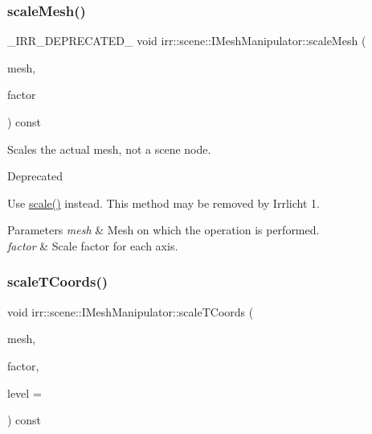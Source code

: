 \subsubsection{\texorpdfstring{scale\+Mesh()}{scaleMesh()}}
{\footnotesize\ttfamily \+\_\+\+I\+R\+R\+\_\+\+D\+E\+P\+R\+E\+C\+A\+T\+E\+D\+\_\+ void irr\+::scene\+::\+I\+Mesh\+Manipulator\+::scale\+Mesh (\begin{DoxyParamCaption}\item[{\hyperlink{classirr_1_1scene_1_1IMesh}{I\+Mesh} $\ast$}]{mesh,  }\item[{const \hyperlink{namespaceirr_1_1core_a06f169d08b5c429f5575acb7edbad811}{core\+::vector3df} \&}]{factor }\end{DoxyParamCaption}) const\hspace{0.3cm}{\ttfamily [inline]}}



Scales the actual mesh, not a scene node. 

\begin{DoxyRefDesc}{Deprecated}
\item[\hyperlink{deprecated__deprecated000014}{Deprecated}]Use \hyperlink{classirr_1_1scene_1_1IMeshManipulator_abd2a0bdd00605f638f619177e64b1cce}{scale()} instead. This method may be removed by Irrlicht 1. \end{DoxyRefDesc}

\begin{DoxyParams}{Parameters}
{\em mesh} & Mesh on which the operation is performed. \\
\hline
{\em factor} & Scale factor for each axis. \\
\hline
\end{DoxyParams}
\mbox{\label{classirr_1_1scene_1_1IMeshManipulator_a2bc907891c8db77eebcad387ae3b31c3}} 
\subsubsection{\texorpdfstring{scale\+T\+Coords()}{scaleTCoords()}\hspace{0.1cm}{\footnotesize\ttfamily [1/2]}}
{\footnotesize\ttfamily void irr\+::scene\+::\+I\+Mesh\+Manipulator\+::scale\+T\+Coords (\begin{DoxyParamCaption}\item[{\hyperlink{classirr_1_1scene_1_1IMesh}{scene\+::\+I\+Mesh} $\ast$}]{mesh,  }\item[{const \hyperlink{namespaceirr_1_1core_a2cf08556d77f6f5a792973a6e27ed11b}{core\+::vector2df} \&}]{factor,  }\item[{\hyperlink{namespaceirr_a0416a53257075833e7002efd0a18e804}{u32}}]{level = {} }\end{DoxyParamCaption}) const\hspace{0.3cm}{\ttfamily [inline]}}



